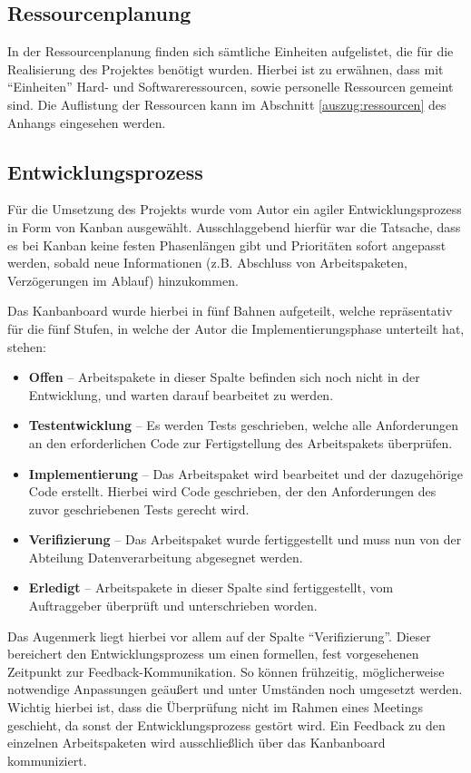 \subsection{Ressourcenplanung}
In der Ressourcenplanung finden sich sämtliche Einheiten aufgelistet, die für
 die Realisierung des Projektes benötigt wurden. Hierbei ist zu erwähnen, dass mit "`Einheiten"' Hard- und Softwareressourcen, sowie personelle Ressourcen gemeint sind.
 Die Auflistung der Ressourcen kann im Abschnitt \ref{auszug:ressourcen} des Anhangs eingesehen werden.

\subsection{Entwicklungsprozess}
Für die Umsetzung des Projekts wurde vom Autor ein agiler Entwicklungsprozess in
Form von Kanban ausgewählt. Ausschlaggebend hierfür war die Tatsache, dass es bei Kanban
keine festen Phasenlängen gibt und Prioritäten sofort angepasst werden, sobald
neue Informationen (z.B. Abschluss von Arbeitspaketen, Verzögerungen im Ablauf) hinzukommen.\par

Das Kanbanboard wurde hierbei in fünf Bahnen aufgeteilt, welche repräsentativ für
die fünf Stufen, in welche der Autor die Implementierungsphase unterteilt hat, stehen:
\begin{itemize}
    \item \textbf{Offen} -- Arbeitspakete in dieser Spalte befinden sich noch
    nicht in der Entwicklung, und warten darauf bearbeitet zu werden.
    \item \textbf{Testentwicklung} -- Es werden Tests geschrieben, welche alle
    Anforderungen an den erforderlichen Code zur Fertigstellung des Arbeitspakets
    überprüfen.
    \item \textbf{Implementierung} -- Das Arbeitspaket wird bearbeitet und der dazugehörige Code erstellt. Hierbei wird Code geschrieben, der den Anforderungen
    des zuvor geschriebenen Tests gerecht wird.
    \item \textbf{Verifizierung} -- Das Arbeitspaket wurde fertiggestellt und
    muss nun von der Abteilung Datenverarbeitung abgesegnet werden.
    \item \textbf{Erledigt} -- Arbeitspakete in dieser Spalte sind fertiggestellt,
    vom Auftraggeber überprüft und unterschrieben worden.
\end{itemize}

Das Augenmerk liegt hierbei vor allem auf der Spalte "`Verifizierung"'.
Dieser bereichert den Entwicklungsprozess um einen formellen, fest vorgesehenen
Zeitpunkt zur Feedback-Kommunikation. So können frühzeitig, möglicherweise notwendige
Anpassungen geäußert und unter Umständen noch umgesetzt werden. Wichtig hierbei
ist, dass die Überprüfung nicht im Rahmen eines Meetings geschieht, da sonst der
Entwicklungsprozess gestört wird. Ein Feedback zu den einzelnen Arbeitspaketen
wird ausschließlich über das Kanbanboard kommuniziert.\par


